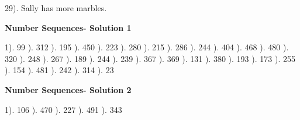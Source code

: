 \documentclass{article}%
\begin{document}
29). Sally has more marbles.%
\newline%
\newpage%
\large%
\begin{center}%
\textbf{Number Sequences- Solution 1}%
\newline%
\end{center} \normalsize%
1). 99%
). 312%
). 195%
). 450%
). 223%
). 280%
). 215%
). 286%
). 244%
). 404%
). 468%
). 480%
). 320%
). 248%
). 267%
). 189%
). 244%
). 239%
). 367%
). 369%
). 131%
). 380%
). 193%
). 173%
). 255%
). 154%
). 481%
). 242%
). 314%
). 23%
\newline%
\newpage%
\large%
\begin{center}%
\textbf{Number Sequences- Solution 2}%
\newline%
\end{center} \normalsize%
1). 106%
). 470%
). 227%
). 491%
). 343%
\newline%
\end{document}
